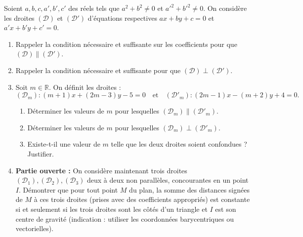 \documentclass[11pt]{article}
\begin{document}
\begin{exercice}
Soient $a, b, c, a', b', c'$ des réels tels que $a^2+b^2 \neq 0$ et $a'^2+b'^2 \neq 0$.
On considère les droites $(\mathcal{D})$ et $(\mathcal{D}')$ d'équations respectives $ax+by+c=0$ et $a'x+b'y+c'=0$.
\begin{enumerate}
    \item Rappeler la condition nécessaire et suffisante sur les coefficients pour que $(\mathcal{D}) \parallel (\mathcal{D}')$.
    \item Rappeler la condition nécessaire et suffisante pour que $(\mathcal{D}) \perp (\mathcal{D}')$.
    \item Soit $m \in \mathbb{R}$. On définit les droites :
    \[(\mathcal{D}_m): (m+1)x + (2m-3)y - 5 = 0 \quad \text{et} \quad (\mathcal{D}'_m): (2m-1)x - (m+2)y + 4 = 0.\]
    \begin{enumerate}
        \item Déterminer les valeurs de $m$ pour lesquelles $(\mathcal{D}_m) \parallel (\mathcal{D}'_m)$.
        \item Déterminer les valeurs de $m$ pour lesquelles $(\mathcal{D}_m) \perp (\mathcal{D}'_m)$.
        \item Existe-t-il une valeur de $m$ telle que les deux droites soient confondues ? Justifier.
    \end{enumerate}
    \item \textbf{Partie ouverte :} On considère maintenant trois droites $(\mathcal{D}_1), (\mathcal{D}_2), (\mathcal{D}_3)$ deux à deux non parallèles, concourantes en un point $I$.
    Démontrer que pour tout point $M$ du plan, la somme des distances signées de $M$ à ces trois droites (prises avec des coefficients appropriés) est constante si et seulement si les trois droites sont les côtés d'un triangle et $I$ est son centre de gravité (indication : utiliser les coordonnées barycentriques ou vectorielles).
\end{enumerate}
\end{exercice}
\end{document}
